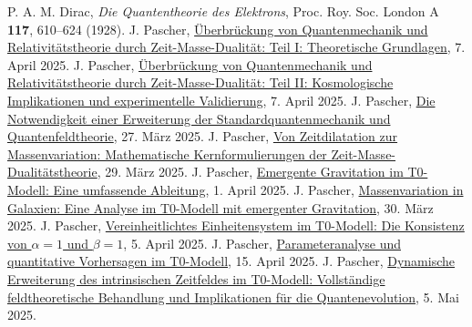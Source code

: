 \documentclass[12pt,a4paper]{article}
\begin{document}
	\begin{thebibliography}{99}
		 P. A. M. Dirac, \textit{Die Quantentheorie des Elektrons}, Proc. Roy. Soc. London A \textbf{117}, 610--624 (1928).
		 J. Pascher, \href{https://github.com/jpascher/T0-Time-Mass-Duality/tree/main/2/pdf/Deutsch/QMRelTimeMassPart1.pdf}{Überbrückung von Quantenmechanik und Relativitätstheorie durch Zeit-Masse-Dualität: Teil I: Theoretische Grundlagen}, 7. April 2025.
		 J. Pascher, \href{https://github.com/jpascher/T0-Time-Mass-Duality/tree/main/2/pdf/Deutsch/QMRelTimeMassPart2.pdf}{Überbrückung von Quantenmechanik und Relativitätstheorie durch Zeit-Masse-Dualität: Teil II: Kosmologische Implikationen und experimentelle Validierung}, 7. April 2025.
		 J. Pascher, \href{https://github.com/jpascher/T0-Time-Mass-Duality/tree/main/2/pdf/Deutsch/NotwendigkeitQMErweiterung.pdf}{Die Notwendigkeit einer Erweiterung der Standardquantenmechanik und Quantenfeldtheorie}, 27. März 2025.
		 J. Pascher, \href{https://github.com/jpascher/T0-Time-Mass-Duality/tree/main/2/pdf/Deutsch/MathZeitMasseLagrange.pdf}{Von Zeitdilatation zur Massenvariation: Mathematische Kernformulierungen der Zeit-Masse-Dualitätstheorie}, 29. März 2025.
		 J. Pascher, \href{https://github.com/jpascher/T0-Time-Mass-Duality/tree/main/2/pdf/Deutsch/EmergentGravT0.pdf}{Emergente Gravitation im T0-Modell: Eine umfassende Ableitung}, 1. April 2025.
		 J. Pascher, \href{https://github.com/jpascher/T0-Time-Mass-Duality/tree/main/2/pdf/Deutsch/MassVarGalaxien.pdf}{Massenvariation in Galaxien: Eine Analyse im T0-Modell mit emergenter Gravitation}, 30. März 2025.
		 J. Pascher, \href{https://github.com/jpascher/T0-Time-Mass-Duality/tree/main/2/pdf/Deutsch/Alpha1Beta1Konsistenz.pdf}{Vereinheitlichtes Einheitensystem im T0-Modell: Die Konsistenz von $\alpha = 1$ und $\beta = 1$}, 5. April 2025.
		 J. Pascher, \href{https://github.com/jpascher/T0-Time-Mass-Duality/tree/main/2/pdf/Deutsch/ParameterAnalisysT0.pdf}{Parameteranalyse und quantitative Vorhersagen im T0-Modell}, 15. April 2025.
		 J. Pascher, \href{https://github.com/jpascher/T0-Time-Mass-Duality/tree/main/2/pdf/Deutsch/DynamicTF-SchrodingerExtensions.pdf}{Dynamische Erweiterung des intrinsischen Zeitfeldes im T0-Modell: Vollständige feldtheoretische Behandlung und Implikationen für die Quantenevolution}, 5. Mai 2025.

\end{thebibliography}
\end{document}
